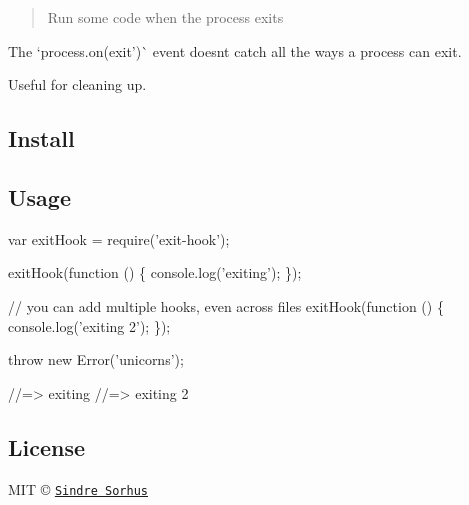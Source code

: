 \begin{quote}
Run some code when the process exits \end{quote}


The `process.\+on(\textquotesingle{}exit')\`{} event doesn\textquotesingle{}t catch all the ways a process can exit.

Useful for cleaning up.

\subsection*{Install}




\subsection*{Usage}


\begin{DoxyCode}
var exitHook = require('exit-hook');

exitHook(function () \{
    console.log('exiting');
\});

// you can add multiple hooks, even across files
exitHook(function () \{
    console.log('exiting 2');
\});

throw new Error('unicorns');

//=> exiting
//=> exiting 2
\end{DoxyCode}


\subsection*{License}

M\+IT © \href{http://sindresorhus.com}{\tt Sindre Sorhus} 